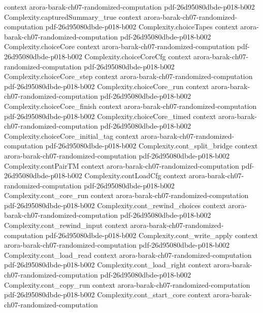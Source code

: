 \begin{theorem}
  {context}
  {arora-barak-ch07-randomized-computation}
  {pdf-26d95080dbde-p018-b002}
\proofstep
  {Complexity.capturedSummary_true}
  {context}
  {arora-barak-ch07-randomized-computation}
  {pdf-26d95080dbde-p018-b002}
\proofstep
  {Complexity.choiceTapes}
  {context}
  {arora-barak-ch07-randomized-computation}
  {pdf-26d95080dbde-p018-b002}
\proofstep
  {Complexity.choiceCore}
  {context}
  {arora-barak-ch07-randomized-computation}
  {pdf-26d95080dbde-p018-b002}
\proofstep
  {Complexity.choiceCoreCfg}
  {context}
  {arora-barak-ch07-randomized-computation}
  {pdf-26d95080dbde-p018-b002}
\proofstep
  {Complexity.choiceCore_step}
  {context}
  {arora-barak-ch07-randomized-computation}
  {pdf-26d95080dbde-p018-b002}
\proofstep
  {Complexity.choiceCore_run}
  {context}
  {arora-barak-ch07-randomized-computation}
  {pdf-26d95080dbde-p018-b002}
\proofstep
  {Complexity.choiceCore_finish}
  {context}
  {arora-barak-ch07-randomized-computation}
  {pdf-26d95080dbde-p018-b002}
\proofstep
  {Complexity.choiceCore_timed}
  {context}
  {arora-barak-ch07-randomized-computation}
  {pdf-26d95080dbde-p018-b002}
\proofstep
  {Complexity.choiceCore_initial_tag}
  {context}
  {arora-barak-ch07-randomized-computation}
  {pdf-26d95080dbde-p018-b002}
\proofstep
  {Complexity.cont_split_bridge}
  {context}
  {arora-barak-ch07-randomized-computation}
  {pdf-26d95080dbde-p018-b002}
\proofstep
  {Complexity.contPairTM}
  {context}
  {arora-barak-ch07-randomized-computation}
  {pdf-26d95080dbde-p018-b002}
\proofstep
  {Complexity.contLoadCfg}
  {context}
  {arora-barak-ch07-randomized-computation}
  {pdf-26d95080dbde-p018-b002}
\proofstep
  {Complexity.cont_core_run}
  {context}
  {arora-barak-ch07-randomized-computation}
  {pdf-26d95080dbde-p018-b002}
\proofstep
  {Complexity.cont_rewind_choices}
  {context}
  {arora-barak-ch07-randomized-computation}
  {pdf-26d95080dbde-p018-b002}
\proofstep
  {Complexity.cont_rewind_input}
  {context}
  {arora-barak-ch07-randomized-computation}
  {pdf-26d95080dbde-p018-b002}
\proofstep
  {Complexity.cont_write_apply}
  {context}
  {arora-barak-ch07-randomized-computation}
  {pdf-26d95080dbde-p018-b002}
\proofstep
  {Complexity.cont_load_read}
  {context}
  {arora-barak-ch07-randomized-computation}
  {pdf-26d95080dbde-p018-b002}
\proofstep
  {Complexity.cont_load_right}
  {context}
  {arora-barak-ch07-randomized-computation}
  {pdf-26d95080dbde-p018-b002}
\proofstep
  {Complexity.cont_copy_run}
  {context}
  {arora-barak-ch07-randomized-computation}
  {pdf-26d95080dbde-p018-b002}
\proofstep
  {Complexity.cont_start_core}
  {context}
  {arora-barak-ch07-randomized-computation}

\end{theorem}
